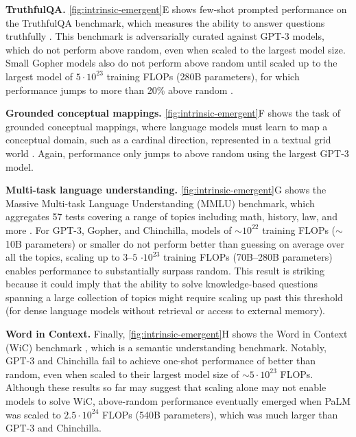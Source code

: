 \documentclass[10pt]{article} %
\begin{document}
\vspace{2.5mm}
\noindent
\textbf{TruthfulQA.}
\cref{fig:intrinsic-emergent}E shows few-shot prompted performance on the TruthfulQA benchmark, which measures the ability to answer questions truthfully \citep{lin2021truthfulqa}.
This benchmark is adversarially curated against GPT-3 models, which do not perform above random, even when scaled to the largest model size. 
Small Gopher models also do not perform above random until scaled up to the largest model of $5 \cdot 10^{23}$ training FLOPs (280B parameters), for which performance jumps to more than 20\% above random \citep{rae2021scaling}.

\vspace{2.5mm}
\noindent
\textbf{Grounded conceptual mappings.}
\cref{fig:intrinsic-emergent}F shows the task of grounded conceptual mappings, where language models must learn to map a conceptual domain, such as a cardinal direction, represented in a textual grid world \citep{patel2021mapping}.
Again, performance only jumps to above random using the largest GPT-3 model.

\vspace{2.5mm}
\noindent
\textbf{Multi-task language understanding.}
\cref{fig:intrinsic-emergent}G shows the Massive Multi-task Language Understanding (MMLU) benchmark, which aggregates 57 tests covering a range of topics including math, history, law, and more \citep{hendrycks2020measuring}. 
For GPT-3, Gopher, and Chinchilla, models of ${\sim}10^{22}$ training FLOPs ($\sim$10B parameters) or smaller do not perform better than guessing on average over all the topics, scaling up to $3$--$5$ $\cdot 10^{23}$ training FLOPs (70B--280B parameters) enables performance to substantially surpass random.
This result is striking because it could imply that the ability to solve knowledge-based questions spanning a large collection of topics might require scaling up past this threshold (for dense language models without retrieval or access to external memory).

\vspace{2.5mm}
\noindent
\textbf{Word in Context.}
Finally, \cref{fig:intrinsic-emergent}H shows the Word in Context (WiC) benchmark \citep{pilehvar-camacho-collados-2019-wic}, which is a semantic understanding benchmark.
Notably, GPT-3 and Chinchilla fail to achieve one-shot performance of better than random, even when scaled to their largest model size of ${\sim}5 \cdot 10^{23}$ FLOPs.
Although these results so far may suggest that scaling alone may not enable models to solve WiC, above-random performance eventually emerged when PaLM was scaled to  $2.5 \cdot 10^{24}$ FLOPs (540B parameters), which was much larger than GPT-3 and Chinchilla.
\end{document}
